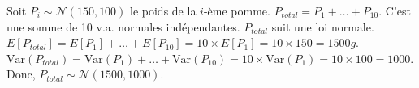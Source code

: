 \begin{correctionbox}
Soit $P_i \sim \mathcal{N}(150, 100)$ le poids de la $i$-ème pomme.
$P_{total} = P_1 + \dots + P_{10}$. C'est une somme de 10 v.a. normales indépendantes.
$P_{total}$ suit une loi normale.
$E[P_{total}] = E[P_1] + \dots + E[P_{10}] = 10 \times E[P_1] = 10 \times 150 = 1500g$.
$\text{Var}(P_{total}) = \text{Var}(P_1) + \dots + \text{Var}(P_{10}) = 10 \times \text{Var}(P_1) = 10 \times 100 = 1000$.
Donc, $P_{total} \sim \mathcal{N}(1500, 1000)$.
\end{correctionbox}
